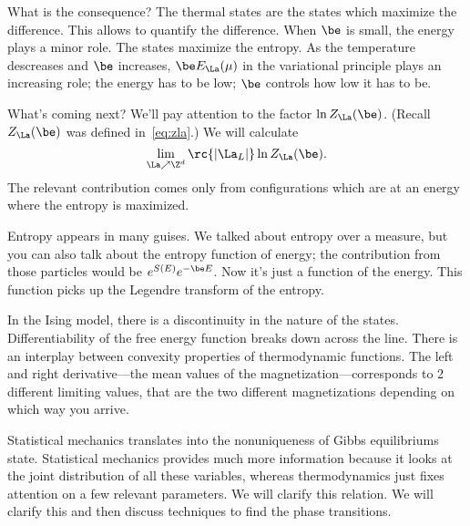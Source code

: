 What is the consequence? The thermal states are the states which maximize the difference. This allows to quantify the difference. When $\be$ is small, the energy plays a minor role. The states maximize the entropy. As the temperature descreases and $\be$ increases, $\be E_\La(\mu)$ in the variational principle plays an increasing role; the energy has to be low; $\be$ controls how low it has to be. 

What's coming next? We'll pay attention to the factor $\ln Z_\La(\be)$. (Recall $Z_\La(\be)$ was defined in~\eqref{eq:zla}.) We will calculate 
\[\lim_{\La \nearrow\Z^d} \rc{|\La_L|} \ln Z_{\La}(\be).\]
The relevant contribution comes only from configurations which are at an energy where the entropy is maximized. 

Entropy appears in many guises. We talked about entropy over a measure, but you can also talk about the entropy function of energy; the contribution from those particles would be $e^{S(E)}e^{-\be E}$. Now it's just a function of the energy. This function picks up the Legendre transform of the entropy.


In the Ising model, there is a discontinuity in the nature of the states. Differentiability of the free energy function breaks down across the line. There is an interplay between convexity properties of thermodynamic functions. The left and right derivative---the mean values of the magnetization---corresponds to 2 different limiting values, that are the two different magnetizations depending on which way you arrive. %

Statistical mechanics translates into the nonuniqueness of Gibbs equilibriums state. Statistical mechanics provides much more information because it looks at the joint distribution of all these variables, whereas thermodynamics just fixes attention on a few relevant parameters. We will clarify this relation. 
We will clarify this and then discuss techniques to find the phase transitions.


